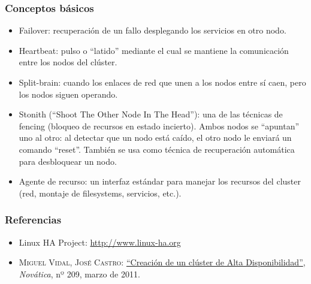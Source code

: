 \documentclass{beamer}
\begin{document}

\begin{frame}
\frametitle{Conceptos básicos}

\begin{itemize}
\item \alert{Failover}: recuperación de un fallo desplegando los servicios en otro nodo.
\item \alert{Heartbeat}: pulso o ``latido'' mediante el cual se mantiene la comunicación entre los nodos del clúster. 
\item \alert{Split-brain}: cuando los enlaces de red que unen a los nodos entre sí caen, pero los nodos siguen operando. 
\item \alert{Stonith} (``Shoot The Other Node In The Head''): una de las técnicas de \alert{fencing} (bloqueo de recursos en estado incierto). Ambos nodos se ``apuntan'' uno al otro: al detectar que un nodo está caído, el otro nodo le enviará un comando ``reset''. También se usa como técnica de recuperación automática para desbloquear un nodo.
\item \alert{Agente de recurso}: un interfaz estándar para manejar los recursos del cluster (red, montaje de filesystems, servicios, etc.). 
\end{itemize}

\end{frame}


\begin{frame}
\frametitle{Referencias}

\begin{itemize}
\item Linux HA Project: \href{http://www.linux-ha.org}{http://www.linux-ha.org}
\item \textsc{Miguel Vidal, José Castro}: \href{http://www.ati.es/novatica/2011/209/Nv209-75.pdf}{``Creación de un clúster de Alta Disponibilidad''}, \textit{Novática}, nº 209, marzo de 2011. 
\end{itemize}

\end{frame}






\end{document}
